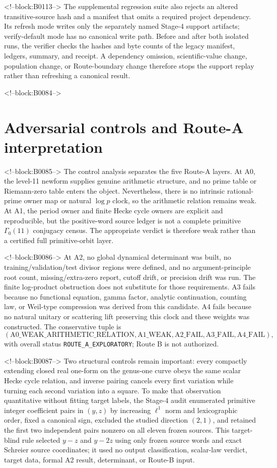 \documentclass[11pt]{article}
\theoremstyle{definition}
\theoremstyle{remark}
\newcommand{\G}{\Gamma_0(11)}
\begin{document}
<!--block:B0113-->
The supplemental regression suite also rejects an altered transitive-source hash and a manifest that omits a required project dependency. Its refresh mode writes only the separately named Stage-4 support artifacts; verify-default mode has no canonical write path. Before and after both isolated runs, the verifier checks the hashes and byte counts of the legacy manifest, ledgers, summary, and receipt. A dependency omission, scientific-value change, population change, or Route-boundary change therefore stops the support replay rather than refreshing a canonical result.

<!--block:B0084-->
\section{Adversarial controls and Route-A interpretation}

<!--block:B0085-->
The control analysis separates the five Route-A layers. At A0, the level-11 newform supplies genuine arithmetic structure, and no prime table or Riemann-zero table enters the object. Nevertheless, there is no intrinsic rational-prime owner map or natural $\log p$ clock, so the arithmetic relation remains weak. At A1, the period owner and finite Hecke cycle owners are explicit and reproducible, but the positive-word source ledger is not a complete primitive $\G$ conjugacy census. The appropriate verdict is therefore weak rather than a certified full primitive-orbit layer.

<!--block:B0086-->
At A2, no global dynamical determinant was built, no training/validation/test divisor regions were defined, and no argument-principle root count, missing/extra-zero report, cutoff drift, or precision drift was run. The finite log-product obstruction does not substitute for those requirements. A3 fails because no functional equation, gamma factor, analytic continuation, counting law, or Weil-type compression was derived from this candidate. A4 fails because no natural unitary or scattering lift preserving this clock and these weights was constructed. The conservative tuple is
\[
(\mathrm{A0\_WEAK\_ARITHMETIC\_RELATION},
\mathrm{A1\_WEAK},\mathrm{A2\_FAIL},\mathrm{A3\_FAIL},\mathrm{A4\_FAIL}),
\]
with overall status \texttt{ROUTE\_A\_EXPLORATORY}; Route B is not authorized.

<!--block:B0087-->
Two structural controls remain important: every compactly extending closed real one-form on the genus-one curve obeys the same scalar Hecke cycle relation, and inverse pairing cancels every first variation while turning each second variation into a square. To make that observation quantitative without fitting target labels, the Stage-4 audit enumerated primitive integer coefficient pairs in $(y,z)$ by increasing $\ell^1$ norm and lexicographic order, fixed a canonical sign, excluded the studied direction $(2,1)$, and retained the first two independent pairs nonzero on all eleven frozen sources. This target-blind rule selected $y-z$ and $y-2z$ using only frozen source words and exact Schreier source coordinates; it used no output classification, scalar-law verdict, target data, formal A2 result, determinant, or Route-B input.
\end{document}
